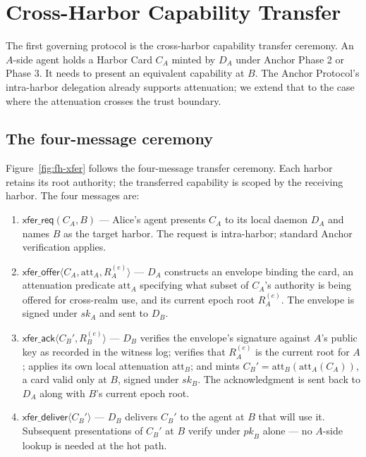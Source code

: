 \documentclass[11pt,a4paper]{article}
\theoremstyle{definition}
\theoremstyle{remark}
\begin{document}


\ifdefined\pdreflectionplate{}\fi
\section{Cross-Harbor Capability Transfer}\label{sec:fh-xfer}

The first governing protocol is the cross-harbor capability transfer ceremony. An $A$-side agent holds a Harbor Card $C_A$ minted by $D_A$ under Anchor Phase 2 or Phase 3. It needs to present an equivalent capability at $B$. The Anchor Protocol's intra-harbor delegation already supports attenuation; we extend that to the case where the attenuation crosses the trust boundary.



\subsection{The four-message ceremony}\label{sec:fh-xfer-ceremony}

Figure~\ref{fig:fh-xfer} follows the four-message transfer ceremony. Each
harbor retains its root authority; the transferred capability is scoped by
the receiving harbor. The four messages are:

\begin{enumerate}[nosep,leftmargin=*]
\item $\mathsf{xfer\_req}(C_A, B)$ --- Alice's agent presents $C_A$ to its local daemon $D_A$ and names $B$ as the target harbor. The request is intra-harbor; standard Anchor verification applies.

\item $\mathsf{xfer\_offer}\langle C_A, \mathrm{att}_A, R_A^{(e)} \rangle$ --- $D_A$ constructs an envelope binding the card, an attenuation predicate $\mathrm{att}_A$ specifying what subset of $C_A$'s authority is being offered for cross-realm use, and its current epoch root $R_A^{(e)}$. The envelope is signed under $\mathit{sk}_A$ and sent to $D_B$.

\item $\mathsf{xfer\_ack}\langle C_B', R_B^{(e)} \rangle$ --- $D_B$ verifies the envelope's signature against $A$'s public key as recorded in the witness log; verifies that $R_A^{(e)}$ is the current root for $A$; applies its own local attenuation $\mathrm{att}_B$; and mints $C_B' = \mathrm{att}_B(\mathrm{att}_A(C_A))$, a card valid only at $B$, signed under $\mathit{sk}_B$. The acknowledgment is sent back to $D_A$ along with $B$'s current epoch root.

\item $\mathsf{xfer\_deliver}\langle C_B' \rangle$ --- $D_B$ delivers $C_B'$ to the agent at $B$ that will use it. Subsequent presentations of $C_B'$ at $B$ verify under $\mathit{pk}_B$ alone --- no $A$-side lookup is needed at the hot path.
\end{enumerate}
\end{document}
